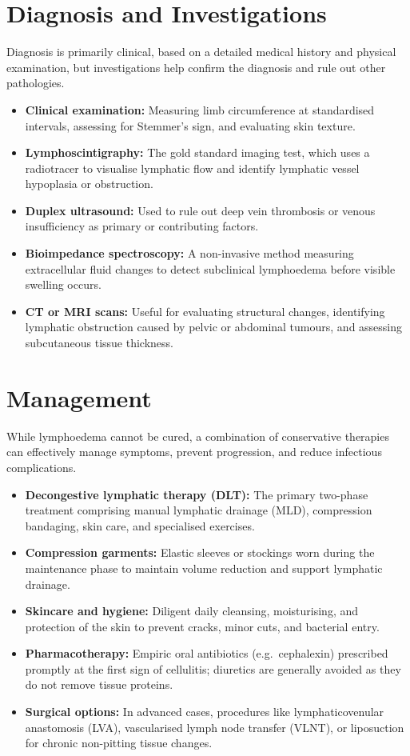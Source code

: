 \section*{Diagnosis and Investigations}
Diagnosis is primarily clinical, based on a detailed medical history and physical examination, but investigations help confirm the diagnosis and rule out other pathologies.
\begin{itemize}
    \item \textbf{Clinical examination:} Measuring limb circumference at standardised intervals, assessing for Stemmer's sign, and evaluating skin texture.
    \item \textbf{Lymphoscintigraphy:} The gold standard imaging test, which uses a radiotracer to visualise lymphatic flow and identify lymphatic vessel hypoplasia or obstruction.
    \item \textbf{Duplex ultrasound:} Used to rule out deep vein thrombosis or venous insufficiency as primary or contributing factors.
    \item \textbf{Bioimpedance spectroscopy:} A non-invasive method measuring extracellular fluid changes to detect subclinical lymphoedema before visible swelling occurs.
    \item \textbf{CT or MRI scans:} Useful for evaluating structural changes, identifying lymphatic obstruction caused by pelvic or abdominal tumours, and assessing subcutaneous tissue thickness.
\end{itemize}

\section*{Management}
While lymphoedema cannot be cured, a combination of conservative therapies can effectively manage symptoms, prevent progression, and reduce infectious complications.
\begin{itemize}
    \item \textbf{Decongestive lymphatic therapy (DLT):} The primary two-phase treatment comprising manual lymphatic drainage (MLD), compression bandaging, skin care, and specialised exercises.
    \item \textbf{Compression garments:} Elastic sleeves or stockings worn during the maintenance phase to maintain volume reduction and support lymphatic drainage.
    \item \textbf{Skincare and hygiene:} Diligent daily cleansing, moisturising, and protection of the skin to prevent cracks, minor cuts, and bacterial entry.
    \item \textbf{Pharmacotherapy:} Empiric oral antibiotics (e.g.\ cephalexin) prescribed promptly at the first sign of cellulitis; diuretics are generally avoided as they do not remove tissue proteins.
    \item \textbf{Surgical options:} In advanced cases, procedures like lymphaticovenular anastomosis (LVA), vascularised lymph node transfer (VLNT), or liposuction for chronic non-pitting tissue changes.
\end{itemize}


